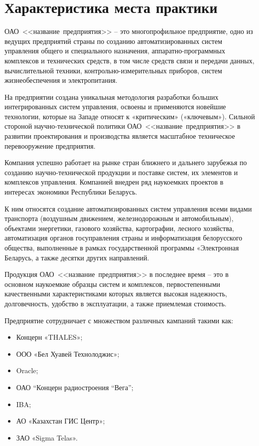 \section{Характеристика места практики}
\label{sec:practice:characteristics}
\newcommand{\company}{\mbox{<<название предприятия>>}}


ОАО~\company{} – это многопрофильное предприятие, одно из ведущих предприятий страны по созданию автоматизированных систем управления общего и специального назначения, аппаратно-программных комплексов и технических средств, в том числе средств связи и передачи данных, вычислительной техники, контрольно-измерительных приборов, систем жизнеобеспечения и электропитания.

На предприятии создана уникальная методология разработки больших интегрированных систем управления, освоены и применяются новейшие технологии, которые на Западе относят к «критическим» («ключевым»). Сильной стороной научно-технической политики ОАО~\company{} в развитии проектирования и производства является масштабное техническое перевооружение предприятия.

Компания успешно работает на рынке стран ближнего и дальнего зарубежья по созданию научно-технической продукции и поставке систем, их элементов и комплексов управления. Компанией внедрен ряд наукоемких проектов в интересах экономики Республики Беларусь.

К ним относятся создание автоматизированных систем управления всеми видами транспорта (воздушным движением, железнодорожным и автомобильным), объектами энергетики, газового хозяйства, картографии, лесного хозяйства, автоматизация органов госуправления страны и информатизация белорусского общества, выполненные в рамках государственной программы «Электронная Беларусь, а также десятки других направлений.

Продукция ОАО~\company{} в последнее время -- это в основном наукоемкие образцы систем и комплексов, первостепенными качественными характеристиками которых является высокая надежность, долговечность, удобство в эксплуатации, а также приемлемая стоимость.

Предприятие сотрудничает с множеством различных кампаний такими как:

\begin{itemize}
  \item Концерн «THALES»;
  \item ООО «Бел Хуавей Технолоджис»;
  \item Oracle;
  \item ОАО “Концерн радиостроения “Вега”;
  \item IBA;
  \item АО «Казахстан ГИС Центр»;

  \item ЗАО «Sigma Telas».

 
\end{itemize}